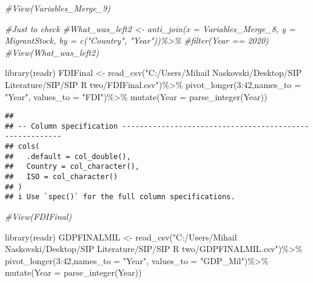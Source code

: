 \documentclass[
]{article}
\newenvironment{Shaded}{\begin{snugshade}}{\end{snugshade}}
\newcommand{\AttributeTok}[1]{\textcolor[rgb]{0.77,0.63,0.00}{#1}}
\newcommand{\CommentTok}[1]{\textcolor[rgb]{0.56,0.35,0.01}{\textit{#1}}}
\newcommand{\DecValTok}[1]{\textcolor[rgb]{0.00,0.00,0.81}{#1}}
\newcommand{\FunctionTok}[1]{\textcolor[rgb]{0.00,0.00,0.00}{#1}}
\newcommand{\NormalTok}[1]{#1}
\newcommand{\OtherTok}[1]{\textcolor[rgb]{0.56,0.35,0.01}{#1}}
\newcommand{\SpecialCharTok}[1]{\textcolor[rgb]{0.00,0.00,0.00}{#1}}
\newcommand{\StringTok}[1]{\textcolor[rgb]{0.31,0.60,0.02}{#1}}
\begin{document}
\begin{Shaded}
\begin{Highlighting}[]
\CommentTok{\#View(Variables\_Merge\_9)}

\CommentTok{\#Just to check}
\CommentTok{\#What\_was\_left2 \textless{}{-} anti\_join(x = Variables\_Merge\_8, y = MigrantStock, by = c("Country", "Year"))\%\textgreater{}\%}
  \CommentTok{\#filter(Year == 2020)}
\CommentTok{\#View(What\_was\_left2)}


\FunctionTok{library}\NormalTok{(readr)}
\NormalTok{FDIFinal }\OtherTok{\textless{}{-}} \FunctionTok{read\_csv}\NormalTok{(}\StringTok{"C:/Users/Mihail Naskovski/Desktop/SIP Literature/SIP/SIP R two/FDIFinal.csv"}\NormalTok{)}\SpecialCharTok{\%\textgreater{}\%}
  \FunctionTok{pivot\_longer}\NormalTok{(}\DecValTok{3}\SpecialCharTok{:}\DecValTok{42}\NormalTok{,}\AttributeTok{names\_to =} \StringTok{"Year"}\NormalTok{, }\AttributeTok{values\_to =} \StringTok{"FDI"}\NormalTok{)}\SpecialCharTok{\%\textgreater{}\%}
  \FunctionTok{mutate}\NormalTok{(}\AttributeTok{Year =} \FunctionTok{parse\_integer}\NormalTok{(Year))}
\end{Highlighting}
\end{Shaded}

\begin{verbatim}
## 
## -- Column specification --------------------------------------------------------
## cols(
##   .default = col_double(),
##   Country = col_character(),
##   ISO = col_character()
## )
## i Use `spec()` for the full column specifications.
\end{verbatim}

\begin{Shaded}
\begin{Highlighting}[]
\CommentTok{\#View(FDIFinal)}

\FunctionTok{library}\NormalTok{(readr)}
\NormalTok{GDPFINALMIL }\OtherTok{\textless{}{-}} \FunctionTok{read\_csv}\NormalTok{(}\StringTok{"C:/Users/Mihail Naskovski/Desktop/SIP Literature/SIP/SIP R two/GDPFINALMIL.csv"}\NormalTok{)}\SpecialCharTok{\%\textgreater{}\%}
  \FunctionTok{pivot\_longer}\NormalTok{(}\DecValTok{3}\SpecialCharTok{:}\DecValTok{42}\NormalTok{,}\AttributeTok{names\_to =} \StringTok{"Year"}\NormalTok{, }\AttributeTok{values\_to =} \StringTok{"GDP\_Mil"}\NormalTok{)}\SpecialCharTok{\%\textgreater{}\%}
  \FunctionTok{mutate}\NormalTok{(}\AttributeTok{Year =} \FunctionTok{parse\_integer}\NormalTok{(Year))}
\end{Highlighting}
\end{Shaded}
\end{document}
